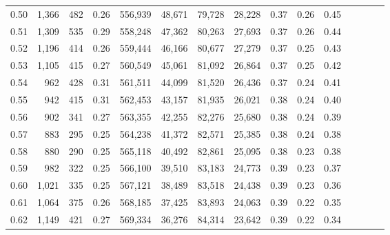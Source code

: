 \begin{tabular}{rrrcrrrrrrrrrrr}
0.50 &   1,366 &    482 &                                       0.26 &  556,939 &   48,671 &   79,728 &   28,228 &  0.37 &  0.26 &                         0.45 \\
0.51 &   1,309 &    535 &                                       0.29 &  558,248 &   47,362 &   80,263 &   27,693 &  0.37 &  0.26 &                         0.44 \\
0.52 &   1,196 &    414 &                                       0.26 &  559,444 &   46,166 &   80,677 &   27,279 &  0.37 &  0.25 &                         0.43 \\
0.53 &   1,105 &    415 &                                       0.27 &  560,549 &   45,061 &   81,092 &   26,864 &  0.37 &  0.25 &                         0.42 \\
0.54 &     962 &    428 &                                       0.31 &  561,511 &   44,099 &   81,520 &   26,436 &  0.37 &  0.24 &                         0.41 \\
0.55 &     942 &    415 &                                       0.31 &  562,453 &   43,157 &   81,935 &   26,021 &  0.38 &  0.24 &                         0.40 \\
0.56 &     902 &    341 &                                       0.27 &  563,355 &   42,255 &   82,276 &   25,680 &  0.38 &  0.24 &                         0.39 \\
0.57 &     883 &    295 &                                       0.25 &  564,238 &   41,372 &   82,571 &   25,385 &  0.38 &  0.24 &                         0.38 \\
0.58 &     880 &    290 &                                       0.25 &  565,118 &   40,492 &   82,861 &   25,095 &  0.38 &  0.23 &                         0.38 \\
0.59 &     982 &    322 &                                       0.25 &  566,100 &   39,510 &   83,183 &   24,773 &  0.39 &  0.23 &                         0.37 \\
0.60 &   1,021 &    335 &                                       0.25 &  567,121 &   38,489 &   83,518 &   24,438 &  0.39 &  0.23 &                         0.36 \\
0.61 &   1,064 &    375 &                                       0.26 &  568,185 &   37,425 &   83,893 &   24,063 &  0.39 &  0.22 &                         0.35 \\
0.62 &   1,149 &    421 &                                       0.27 &  569,334 &   36,276 &   84,314 &   23,642 &  0.39 &  0.22 &                         0.34 \\

\end{tabular}
